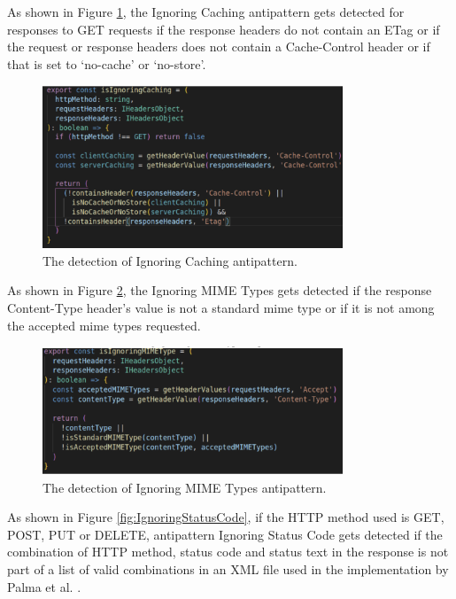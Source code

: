 As shown in Figure \ref{fig:IgnoringCaching}, the Ignoring Caching antipattern gets detected for responses to GET requests if the response headers do not contain an ETag or if the request or response headers does not contain a Cache-Control header or if that is set to `no-cache' or `no-store'.

\begin{figure}[h!]
 \centering
 \includegraphics[width=0.8\textwidth]{img/ignoringCaching.png}
 \caption{The detection of Ignoring Caching antipattern.}
 \label{fig:IgnoringCaching}
\end{figure}

As shown in Figure \ref{fig:IgnoringMIMETypes}, the Ignoring MIME Types gets detected if the response Content-Type header's value is not a standard mime type or if it is not among the accepted mime types requested.

\begin{figure}[h!]
 \centering
 \includegraphics[width=0.8\textwidth]{img/ignoringMimeType.png}
 \caption{The detection of Ignoring MIME Types antipattern.}
 \label{fig:IgnoringMIMETypes}
\end{figure}

As shown in Figure \ref{fig:IgnoringStatusCode}, if the HTTP method used is GET, POST, PUT or DELETE, antipattern Ignoring Status Code gets detected if the combination of HTTP method, status code and status text in the response is not part of a list of valid combinations in an XML file used in the implementation by Palma et al.  \cite{linguistic}.

